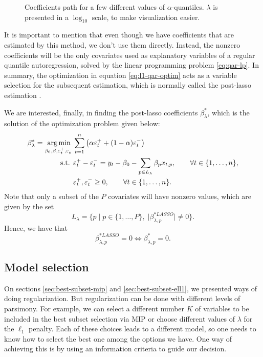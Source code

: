 \begin{figure}
\begin{minipage}[t]{0.4\linewidth}
\begin{minipage}[b]{\linewidth}
      \label{fig:npqar-cross}
     \end{minipage}
  \end{minipage}
  \caption{Coefficients path for a few different values of $\alpha$-quantiles. $\lambda$ is presented in a $\log_{10}$ scale, to make visualization easier.}
  \label{fig:npqar-results}
\end{figure}

It is important to mention that even though we have coefficients that are estimated by this method, we don't use them directly. Instead, the nonzero coefficients will be the only covariates used as explanatory variables of a regular quantile autoregression, solved by the linear programming problem \ref{eq:qar-lp}. In summary, the optimization in equation \ref{eq:l1-qar-optim} acts as a variable selection for the subsequent estimation, which is normally called the post-lasso estimation \cite{belloni2009least}.

We are interested, finally, in finding the post-lasso coefficients $\beta_\lambda^*$, which is the solution of the optimization problem given below:
\begin{equation}
\begin{aligned} \beta_\lambda^{*} = \operatorname*{arg\,min}_{\beta_0,\beta,\varepsilon_{t}^{+},\varepsilon_{t}^{-}} & \sum_{t=1}^{n}\left(\alpha\varepsilon_{t}^{+}+(1-\alpha)\varepsilon_{t}^{-}\right)\\
\mbox{s.t. } & \varepsilon_{t}^{+}-\varepsilon_{t}^{-}=y_{t} - \beta_0 - \sum_{p\in L_\lambda} \beta_p x_{t,p},\qquad\forall t\in\{1,\dots,n\},\\
& \varepsilon_t^+,\varepsilon_t^- \geq 0, \qquad \forall t \in \{1,\dots,n\}.
\end{aligned}
\label{eq:post-lasso}
\end{equation}
Note that only a subset of the $P$ covariates will have nonzero values, which are given by the set 
\begin{equation*}
L_\lambda = \{ p \; | \; p \in \{ 1,\dots,P \}, \; |\beta^{*LASSO}_{\lambda,p}| \neq 0  \}.
\end{equation*}
Hence, we have that
$$\beta^{*LASSO}_{\lambda,p} = 0 \iff \beta^{*}_{\lambda,p} = 0.$$

\subsection{Model selection}

On sections \ref{sec:best-subset-mip} and \ref{sec:best-subset-ell1}, we presented ways of doing regularization. But regularization can be done with different levels of parsimony. For example, we can select a different number $K$ of variables to be included in the best subset selection via MIP or choose different values of $\lambda$ for the $\ell_1$ penalty. Each of these choices leads to a different model, so one needs to know how to select the best one among the options we have. One way of achieving this is by using an information criteria to guide our decision. 


